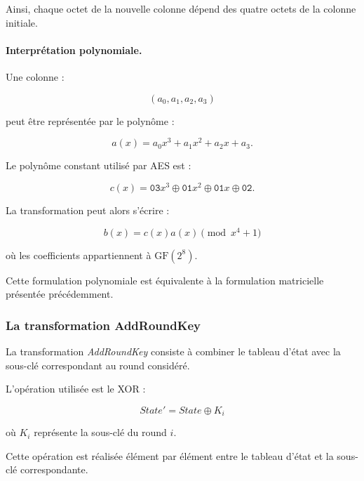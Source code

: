 \documentclass[12pt,a4paper]{article}
\begin{document}
Ainsi, chaque octet de la nouvelle colonne dépend des quatre octets
de la colonne initiale.



\paragraph{Interprétation polynomiale.}

Une colonne :

\[
(a_0,a_1,a_2,a_3)
\]

peut être représentée par le polynôme :

\[
a(x)=a_0x^3+a_1x^2+a_2x+a_3.
\]

Le polynôme constant utilisé par AES est :

\[
c(x)=
\texttt{03}x^3
\oplus
\texttt{01}x^2
\oplus
\texttt{01}x
\oplus
\texttt{02}.
\]

La transformation peut alors s'écrire :

\[
\boxed{
b(x)=c(x)a(x)\pmod{x^4+1}
}
\]

où les coefficients appartiennent à $\mathrm{GF}(2^8)$.

Cette formulation polynomiale est équivalente à la formulation
matricielle présentée précédemment.



\subsubsection{La transformation AddRoundKey}

La transformation \textit{AddRoundKey} consiste à combiner le tableau
d'état avec la sous-clé correspondant au round considéré.

L'opération utilisée est le XOR :

\[
\boxed{
State'=State\oplus K_i
}
\]

où $K_i$ représente la sous-clé du round $i$.

Cette opération est réalisée élément par élément entre le tableau
d'état et la sous-clé correspondante.


\end{document}
